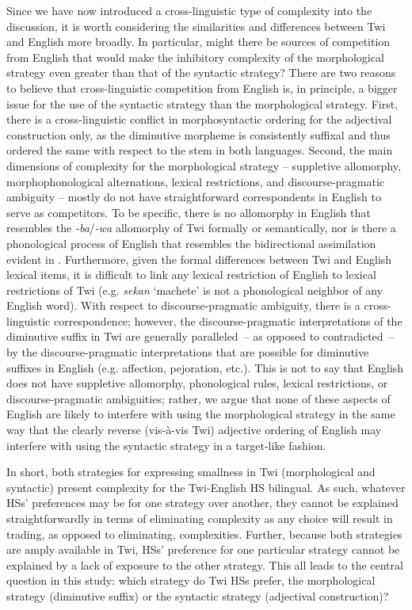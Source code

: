 \documentclass[output=paper,colorlinks,citecolor=brown]{langscibook}
\begin{document}
Since we have now introduced a cross-linguistic type of complexity into the discussion, it is worth considering the similarities and differences between Twi and English more broadly. In particular, might there be sources of competition from English that would make the inhibitory complexity of the morphological strategy even greater than that of the syntactic strategy? There are two reasons to believe that cross-linguistic competition from English is, in principle, a bigger issue for the use of the syntactic strategy than the morphological strategy. First, there is a cross-linguistic conflict in morphosyntactic ordering for the adjectival construction only, as the diminutive morpheme is consistently suffixal and thus ordered the same with respect to the stem in both languages. Second, the main dimensions of complexity for the morphological strategy -- suppletive allomorphy, morphophonological alternations, lexical restrictions, and discourse-pragmatic ambiguity -- mostly do not have straightforward correspondents in English to serve as competitors. To be specific, there is no allomorphy in English that resembles the \textit{-ba}/\textit{-wa} allomorphy of Twi formally or semantically, nor is there a phonological process of English that resembles the bidirectional assimilation evident in . Furthermore, given the formal differences between Twi and English lexical items, it is difficult to link any lexical restriction of English to lexical restrictions of Twi (e.g. \textit{sekan} `machete' is not a phonological neighbor of any English word). With respect to discourse-pragmatic ambiguity, there is a cross-linguistic correspondence; however, the discourse-pragmatic interpretations of the diminutive suffix in Twi are generally paralleled~-- as opposed to contradicted~-- by the discourse-pragmatic interpretations that are possible for diminutive suffixes in English (e.g. affection, pejoration, etc.). This is not to say that English does not have suppletive allomorphy, phonological rules, lexical restrictions, or discourse-pragmatic ambiguities; rather, we argue that none of these aspects of English are likely to interfere with using the morphological strategy in the same way that the clearly reverse (vis-{\`a}-vis Twi) adjective ordering of English may interfere with using the syntactic strategy in a target-like fashion.

In short, both strategies for expressing smallness in Twi (morphological and syntactic) present complexity for the Twi-English HS bilingual. As such, whatever HSs' preferences may be for one strategy over another, they cannot be explained straightforwardly in terms of eliminating complexity as any choice will result in trading, as opposed to eliminating, complexities. Further, because both strategies are amply available in Twi, HSs' preference for one particular strategy cannot be explained by a lack of exposure to the other strategy. This all leads to the central question in this study: which strategy do Twi HSs prefer, the morphological strategy (diminutive suffix) or the syntactic strategy (adjectival construction)? 
\end{document}
